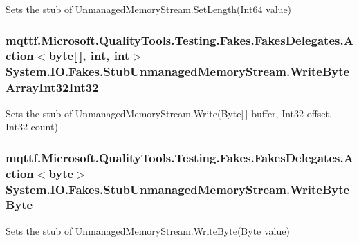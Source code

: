 Sets the stub of Unmanaged\-Memory\-Stream.\-Set\-Length(\-Int64 value)

\hypertarget{class_system_1_1_i_o_1_1_fakes_1_1_stub_unmanaged_memory_stream_ad54b64860c6a2b9d8c36f7d1fb5ec5e9}{
\subsubsection[{Write\-Byte\-Array\-Int32\-Int32}]{\setlength{\rightskip}{0pt plus 5cm}mqttf.\-Microsoft.\-Quality\-Tools.\-Testing.\-Fakes.\-Fakes\-Delegates.\-Action$<$byte\mbox{[}$\,$\mbox{]}, int, int$>$ System.\-I\-O.\-Fakes.\-Stub\-Unmanaged\-Memory\-Stream.\-Write\-Byte\-Array\-Int32\-Int32}}\label{class_system_1_1_i_o_1_1_fakes_1_1_stub_unmanaged_memory_stream_ad54b64860c6a2b9d8c36f7d1fb5ec5e9}


Sets the stub of Unmanaged\-Memory\-Stream.\-Write(\-Byte\mbox{[}$\,$\mbox{]} buffer, Int32 offset, Int32 count)

\hypertarget{class_system_1_1_i_o_1_1_fakes_1_1_stub_unmanaged_memory_stream_aeee8d93c95b5cee54ef7244163fdf404}{
\subsubsection[{Write\-Byte\-Byte}]{\setlength{\rightskip}{0pt plus 5cm}mqttf.\-Microsoft.\-Quality\-Tools.\-Testing.\-Fakes.\-Fakes\-Delegates.\-Action$<$byte$>$ System.\-I\-O.\-Fakes.\-Stub\-Unmanaged\-Memory\-Stream.\-Write\-Byte\-Byte}}\label{class_system_1_1_i_o_1_1_fakes_1_1_stub_unmanaged_memory_stream_aeee8d93c95b5cee54ef7244163fdf404}


Sets the stub of Unmanaged\-Memory\-Stream.\-Write\-Byte(\-Byte value)

